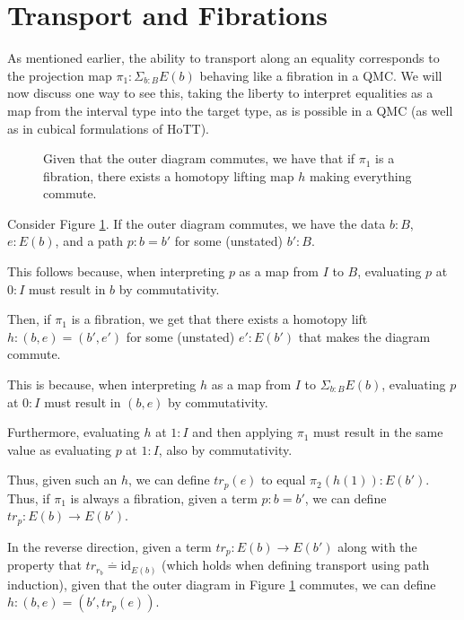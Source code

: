 \documentclass{amsart}
\theoremstyle{definition}
\newcommand{\defeq}{\ensuremath{\overset{\boldsymbol{\cdot}}{=}}}
\begin{document}



\appendix

\section{Transport and Fibrations}
\label{sec:transport-explanation}

As mentioned earlier, the ability to transport along an equality corresponds to the projection map $\pi_1 : \Sigma_{b : B} E(b)$ behaving like a fibration in a QMC. We will now discuss one way to see this, taking the liberty to interpret equalities as a map from the interval type into the target type, as is possible in a QMC (as well as in cubical formulations of HoTT).

\begin{figure}[h]
    \centering
    
    \caption{Given that the outer diagram commutes, we have that if $\pi_1$ is a fibration, there exists a homotopy lifting map $h$ making everything commute.}
    \label{fig:transport-as-fibration}
\end{figure}

Consider Figure \ref{fig:transport-as-fibration}. If the outer diagram commutes, we have the data $b : B$, $e : E(b)$, and a path $p : b = b'$ for some (unstated) $b' : B$.

This follows because, when interpreting $p$ as a map from $I$ to $B$, evaluating $p$ at $0 : I$ must result in $b$ by commutativity.

Then, if $\pi_1$ is a fibration, we get that there exists a homotopy lift $h : (b, e) = (b', e')$ for some (unstated) $e' : E(b')$ that makes the diagram commute.

This is because, when interpreting $h$ as a map from $I$ to $\Sigma_{b : B} E(b)$, evaluating $p$ at $0 : I$ must result in $(b, e)$ by commutativity.

Furthermore, evaluating $h$ at $1 : I$ and then applying $\pi_1$ must result in the same value as evaluating $p$ at $1 : I$, also by commutativity.

Thus, given such an $h$, we can define $tr_p (e)$ to equal $\pi_2 (h (1)) : E(b')$. Thus, if $\pi_1$ is always a fibration, given a term $p : b = b'$, we can define $tr_p : E(b) \to E(b')$.

In the reverse direction, given a term $tr_p : E(b) \to E(b')$ along with the property that $tr_{r_b} \defeq \text{id}_{E(b)}$ (which holds when defining transport using path induction), given that the outer diagram in Figure \ref{fig:transport-as-fibration} commutes, we can define $h : (b, e) = (b', tr_p (e))$.
\end{document}
